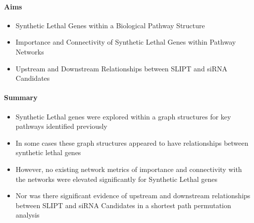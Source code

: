 \paragraph{Aims}

  \begin{itemize}
   \item Synthetic Lethal Genes within a Biological Pathway Structure
   
   \bigskip
   
   \item Importance and Connectivity of Synthetic Lethal Genes within Pathway Networks
   
   \bigskip
   
   \item Upstream and Downstream Relationships between SLIPT and siRNA Candidates
  \end{itemize}

\paragraph{Summary}

  \begin{itemize}
   \item Synthetic Lethal genes were explored within a graph structures for key pathways identified previously 
   
   \bigskip
   
   \item In some cases these graph structures appeared to have relationships between synthetic lethal genes  
   
   \bigskip
   
   \item However, no existing network metrics of importance and connectivity with the networks were elevated significantly for Synthetic Lethal genes
   
   \bigskip
   
   \item Nor was there significant evidence of upstream and downstream relationships between SLIPT and siRNA Candidates in a shortest path permutation analysis
  \end{itemize}
  
\clearpage